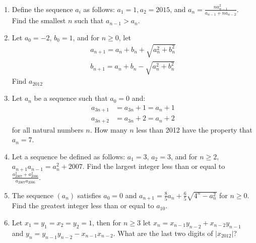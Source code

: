 \documentclass[11pt]{article}
\theoremstyle{theorem}
\theoremstyle{definition}
\theoremstyle{remark}
\theoremstyle{definition}
\theoremstyle{remark}
\begin{document}
\begin{enumerate}
\item Define the sequence $a_i$ as follows: $a_1=1, a_2 = 2015$, and $a_n=\frac{na_{n-1}^2}{a_{n-1}+na_{n-2}}$. Find the smallest $n$ such that $a_{n-1} > a_n$. %

\item Let $a_0=-2$, $b_0=1$, and for $n\ge 0$, let
\begin{align*}
a_{n+1}=a_n+b_n+\sqrt{a_n^2+b_n^2}\\
b_{n+1}=a_n+b_n-\sqrt{a_n^2+b_n^2}
\end{align*}
Find $a_{2012}$ %

\item Let $a_n$ be a sequence such that $a_0=0$ and:
\begin{align*}
a_{3n+1} &= a_{3n} + 1= a_n + 1 \\
a_{3n+2} &= a_{3n} + 2 = a_n + 2
\end{align*}
for all natural numbers $n$. How many $n$ less than 2012 have the property that $a_n=7$. %

\item Let a sequence be defined as follows: $a_{1}= 3$, $a_{2}= 3$, and for $n \ge 2$, $a_{n+1}a_{n-1}= a_{n}^{2}+2007$. Find the largest integer less than or equal to $\frac{a_{2007}^{2}+a_{2006}^{2}}{a_{2007}a_{2006}}$. %

\item The sequence $(a_n)$ satisfies $a_0=0$ and $a_{n+1}=\frac{8}{5}a_n+\frac{6}{5}\sqrt{4^n-a_n^2}$ for $n\ge 0$. Find the greatest integer less than or equal to $a_{10}$.

\item Let $x_1=y_1=x_2=y_2=1$, then for $n \ge 3$ let $x_n=x_{n-1}y_{n-2}+x_{n-2}y_{n-1}$ and $y_{n}=y_{n-1}y_{n-2}-x_{n-1}x_{n-2}$. What are the last two digits of $|x_{2012}|$? %

\end{enumerate}
\end{document}
